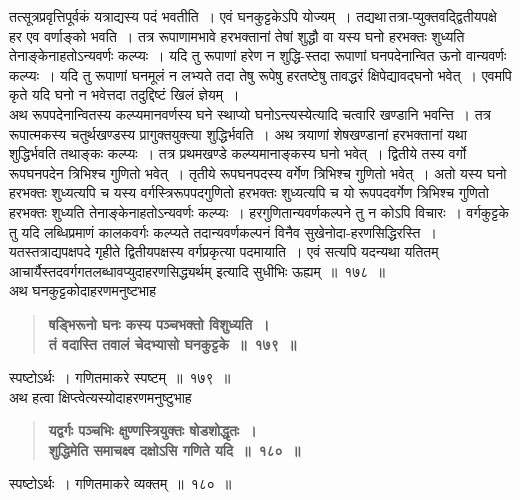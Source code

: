 \documentclass[11pt, openany]{book}
\begin{document}
\newpage

\begin{sloppypar}
\noindent तत्सूत्रप्रवृत्तिपूर्वकं यत्राद्यस्य पदं भवतीति~। एवं घनकुट्टकेऽपि योज्यम्~। तद्यथा\textendash \,तत्रा-प्युक्तवद्द्वितीयपक्षे हर एव वर्णाङ्को भवति~। तत्र रूपाणामभावे हरभक्तानां तेषां शुद्धौ वा यस्य घनो हरभक्तः शुध्यति तेनाङ्केनाहतोऽन्यवर्णः कल्प्यः~। यदि तु रूपाणां हरेण न शुद्धि-स्तदा रूपाणां घनपदेनान्वित ऊनो वान्यवर्णः कल्प्यः~। यदि तु रूपाणां घनमूलं न लभ्यते तदा तेषु रूपेषु हरतष्टेषु तावद्धरं क्षिपेद्यावद्घनो भवेत्~। एवमपि कृते यदि घनो न भवेत्तदा तदुद्दिष्टं खिलं ज्ञेयम्~।\\ 

अथ रूपपदेनान्वितस्य कल्प्यमानवर्णस्य घने स्थाप्यो घनोऽन्त्यस्येत्यादि चत्वारि खण्डानि भवन्ति~। तत्र रूपात्मकस्य चतुर्थखण्डस्य प्रागुक्तयुक्त्या शुद्धिर्भवति~। अथ त्रयाणां शेषखण्डानां हरभक्तानां यथा शुद्धिर्भवति तथाङ्कः कल्प्यः~। तत्र प्रथमखण्डे कल्प्यमानाङ्कस्य घनो भवेत्~। द्वितीये तस्य वर्गो रूपघनपदेन त्रिभिश्च गुणितो भवेत्~। तृतीये रूपघनपदस्य वर्गेण त्रिभिश्च गुणितो भवेत्~। अतो यस्य घनो हरभक्तः शुध्यत्यपि च यस्य वर्गस्त्रिरूपपदगुणितो हरभक्तः शुध्यत्यपि च यो रूपपदवर्गेण त्रिभिश्च गुणितो हरभक्तः शुध्यति तेनाङ्केनाहतोऽन्यवर्णः कल्प्यः~। हरगुणितान्यवर्णकल्पने तु न कोऽपि विचारः~। वर्गकुट्टके तु यदि लब्धिप्रमाणं कालकवर्गः कल्प्यते तदान्यवर्णकल्पनं विनैव सुखेनोदा-हरणसिद्धिरस्ति~। यतस्तत्राद्यपक्षपदे गृहीते द्वितीयपक्षस्य वर्गप्रकृत्या पदमायाति~। एवं सत्यपि यदन्यथा यतितम् आचार्यैस्तदवर्गगतलब्धावप्युदाहरणसिद्ध्यर्थम् इत्यादि सुधीभिः ऊह्यम्~॥~१७८~॥\\

{\small अथ घनकुट्टकोदाहरणमनुष्टभाह\textendash }

 \label{10.179}
\begin{quote}
{\large \textbf{{\color{purple}षड्भिरूनो घनः कस्य पञ्चभक्तो विशुध्यति~।\\
तं वदास्ति तवालं चेदभ्यासो घनकुट्टके~॥~१७९~॥}}}
\end{quote}

स्पष्टोऽर्थः~। गणितमाकरे स्पष्टम्~॥~१७९~॥ \\

{\small अथ हत्वा क्षिप्त्वेत्यस्योदाहरणमनुष्टुभाह\textendash }

 \label{10.180}
\begin{quote}
{\large \textbf{{\color{purple}यद्वर्गः पञ्चभिः क्षुण्णस्त्रियुक्तः षोडशोद्धृतः~।\\
शुद्धिमेति समाचक्ष्व दक्षोऽसि गणिते यदि~॥~१८०~॥}}}
\end{quote}

स्पष्टोऽर्थः~। गणितमाकरे व्यक्तम्~॥~१८०~॥ 
\end{sloppypar}
\end{document}
